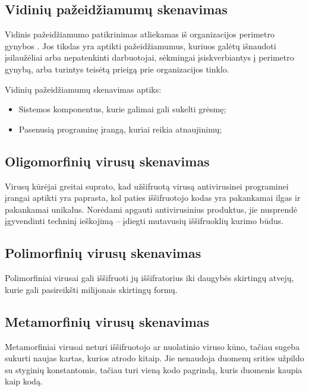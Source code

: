 \documentclass[a4paper,12pt,fleqn]{article}
\begin{document}
\subsection{Vidinių pažeidžiamumų skenavimas}
\label{sec:example}

Vidinis pažeidžiamumo patikrinimas atliekamas iš organizacijos perimetro gynybos \cite{asbjornslett1999assess}. Jos tikslas yra aptikti pažeidžiamumus, kuriuos galėtų išnaudoti įsilaužėliai arba nepatenkinti darbuotojai, sėkmingai įsiskverbiantys į perimetro gynybą, arba turintys teisėtą prieigą prie organizacijos tinklo.

Vidinių pažeidžiamumų skenavimas aptiks:
\begin{itemize}
	\item Sistemos komponentus, kurie galimai gali sukelti grėsmę;
	\item Pasenusią programinę įrangą, kuriai reikia atnaujinimų;
\end{itemize}



\subsection{Oligomorfinių virusų skenavimas}
\label{sec:example}

Virusų kūrėjai greitai suprato, kad užšifruotą virusą antivirusinei programinei įrangai aptikti yra paprasta, kol paties iššifruotojo kodas yra pakankamai ilgas ir pakankamai unikalus. Norėdami apgauti antivirusinius produktus, jie nusprendė įgyvendinti techninį ieškojimą – įdiegti mutavusių iššifruoklių kurimo būdus\cite{Szor:2005:ACV:1050957}. 

\subsection{Polimorfinių virusų skenavimas}
\label{sec:example}

Polimorfiniai virusai gali iššifruoti jų iššifratorius iki daugybės skirtingų atvejų, kurie gali pasireikšti milijonais skirtingų formų\cite{Szor:2005:ACV:1050957}. 

\subsection{Metamorfinių virusų skenavimas}
\label{sec:example}

Metamorfiniai virusai neturi iššifruotojo ar nuolatinio viruso kūno, tačiau sugeba sukurti naujas kartas, kurios atrodo kitaip. Jie nenaudoja duomenų srities užpildo su styginių konstantomis, tačiau turi vieną kodo pagrindą, kuris duomenis kaupia kaip kodą\cite{Szor:2005:ACV:1050957}. 
\end{document}
